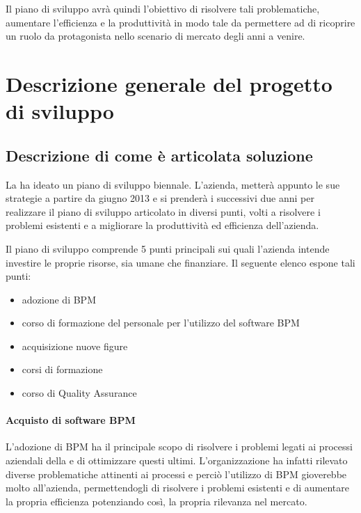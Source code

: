 Il piano di sviluppo avrà quindi l'obiettivo di risolvere tali problematiche, aumentare l'efficienza e la produttività in modo tale da permettere ad \customer di ricoprire un ruolo da protagonista nello scenario di mercato degli anni a venire.

\chapter{Descrizione generale del progetto di sviluppo}

\section{Descrizione di come è articolata soluzione}
La \customer ha ideato un piano di sviluppo biennale. L'azienda, metterà appunto le sue strategie a partire da giugno 2013 e si prenderà i successivi due anni per realizzare il piano di sviluppo articolato in diversi punti, volti a risolvere i problemi esistenti e a migliorare la produttività ed efficienza dell'azienda.
		
Il piano di sviluppo comprende 5 punti principali sui quali l'azienda intende investire le proprie risorse, sia umane che finanziare. Il seguente elenco espone tali punti:
	\begin{itemize}
  		\item adozione di  BPM
       \item corso di formazione del personale per l'utilizzo del software BPM
       \item acquisizione nuove figure
       \item corsi di formazione 
        \item corso di Quality Assurance  
     \end{itemize}
	
	
    \subsubsection{Acquisto di software BPM}
    
    L'adozione di  BPM ha il principale scopo di risolvere i problemi legati ai processi aziendali della \customer e di ottimizzare questi ultimi. L'organizzazione ha infatti rilevato diverse problematiche attinenti ai processi e perciò l'utilizzo di \sw BPM gioverebbe molto all'azienda, permettendogli di risolvere i problemi esistenti e di aumentare la propria efficienza potenziando così, la propria rilevanza nel mercato.



